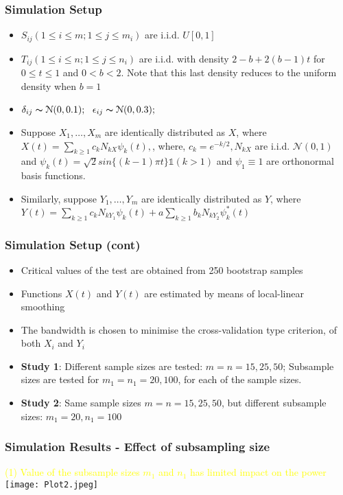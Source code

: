 \documentclass[10pt,dvipsnames,table]{beamer}
\newcommand{\Ind}{\mathds{1}}
\begin{document}
\begin{frame}
\frametitle{Simulation Setup}
\begin{itemize}
\item
$S_{ij} (1 \leq i \leq m; 1 \leq j \leq m_i)$ are i.i.d. $U[0, 1]$
\item
$T_{ij} (1 \leq i \leq n; 1 \leq j \leq n_i)$ are i.i.d. with density $2 − b + 2(b − 1)t$ for $0 \leq t \leq 1$ and $0 < b < 2$. Note that this last density reduces to the uniform
density when $b = 1$
\item
$\delta_{ij} \thicksim \mathcal{N}(0, 0.1); \ \ \epsilon_{ij} \thicksim \mathcal{N}(0, 0.3);$
\item
Suppose $X_1, \dots,X_m$ are identically distributed as $X$, where $X(t) = \sum_{k \geq 1} c_k N_{kX} \psi_k(t),$, where, $c_k = e^{-k/2}, N_{kX}$ are i.i.d. $\mathcal{N}(0,1)$ and $\psi _k(t) = \sqrt{2} sin\{(k −1)\pi t\}\Ind(k > 1)$ and $\psi _1 \equiv 1$ are orthonormal basis functions.
\item
Similarly, suppose $Y_1, \dots,Y_m$ are identically distributed as $Y$, where $Y(t) = \sum_{k \geq 1} c_k N_{kY_1}\psi_k(t) + a\sum_{k \geq 1} b_k N_{kY_2}\psi ^* _k(t)$
\end{itemize}
\end{frame}

\begin{frame}
\frametitle{Simulation Setup (cont)}
\begin{itemize}
\item
Critical values of the test are obtained from 250 bootstrap samples
\item
Functions $X(t)$ and $Y(t)$ are estimated by means of local-linear smoothing
\item
The bandwidth is chosen to minimise the cross-validation type criterion, of both $X_i$ and $Y_i$
\item 
{\bf{Study 1}}: Different sample sizes are tested: $m = n = 15, 25, 50$; Subsample sizes are tested for $m_1 = n_1 = 20, 100$, for each of the sample sizes. 
\item 
{\bf{Study 2}}: Same sample sizes $m = n = 15, 25, 50$, but different subsample sizes: $m_1 = 20, n_1 = 100$
\end{itemize}
\end{frame}

\begin{frame}
\frametitle{Simulation Results - Effect of subsampling size}
\textcolor{yellow}{(1) Value of the subsample sizes $m_1$ and $n_1$ has limited impact on the power}\\ 

\texttt{[image: Plot2.jpeg]}
\end{frame}
\end{document}
